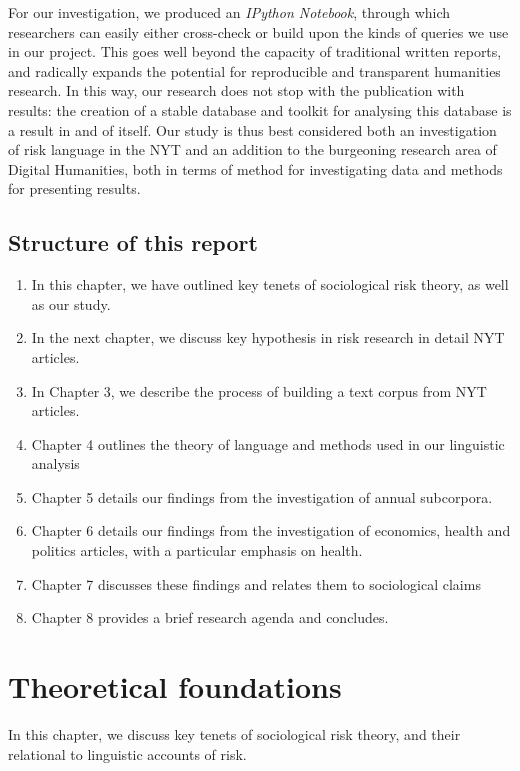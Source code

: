 \documentclass{report}
\begin{document}
For our investigation, we produced an \emph{IPython Notebook}, through which researchers can easily either cross-check or build upon the kinds of queries we use in our project. This goes well beyond the capacity of traditional written reports, and radically expands the potential for reproducible and transparent humanities research. In this way, our research does not stop with the publication with results: the creation of a stable database and toolkit for analysing this database is a result in and of itself. Our study is thus best considered both an investigation of risk language in the NYT and an addition to the burgeoning research area of Digital Humanities, both in terms of method for investigating data and methods for presenting results.

\section{Structure of this report}

\begin{enumerate}
\item In this chapter, we have outlined key tenets of sociological risk theory, as well as our study.
\item In the next chapter, we discuss key hypothesis in risk research in detail NYT articles.
\item In Chapter 3, we describe the process of building a text corpus from NYT articles.
\item Chapter 4 outlines the theory of language and methods used in our linguistic analysis
\item Chapter 5 details our findings from the investigation of annual subcorpora.
\item Chapter 6 details our findings from the investigation of economics, health and politics articles, with a particular emphasis on health.
\item Chapter 7 discusses these findings and relates them to sociological claims
\item Chapter 8 provides a brief research agenda and concludes.
\end{enumerate}



\chapter{Theoretical foundations}

In this chapter, we discuss key tenets of sociological risk theory, and their relational to linguistic accounts of risk.
\end{document}
